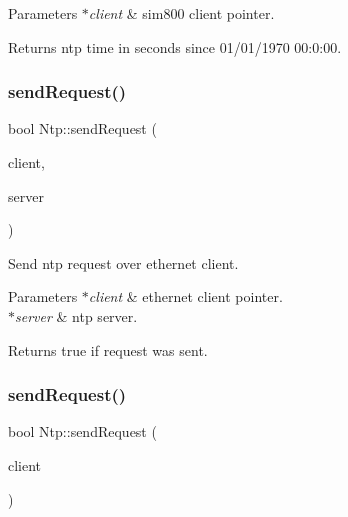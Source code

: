 \begin{DoxyParams}{Parameters}
{\em $\ast$client} & sim800 client pointer. \\
\hline
\end{DoxyParams}
\begin{DoxyReturn}{Returns}
ntp time in seconds since 01/01/1970 00\+:0\+:00. 
\end{DoxyReturn}
\mbox{\label{classNtp_a439e0498ea9209f74d91d7cf4d8805b0}} 
\subsubsection{\texorpdfstring{send\+Request()}{sendRequest()}\hspace{0.1cm}{\footnotesize\ttfamily [1/2]}}
{\footnotesize\ttfamily bool Ntp\+::send\+Request (\begin{DoxyParamCaption}\item[{Ethernet\+U\+DP $\ast$}]{client,  }\item[{const char $\ast$}]{server }\end{DoxyParamCaption})\hspace{0.3cm}{\ttfamily [static]}}



Send ntp request over ethernet client. 


\begin{DoxyParams}{Parameters}
{\em $\ast$client} & ethernet client pointer. \\
\hline
{\em $\ast$server} & ntp server. \\
\hline
\end{DoxyParams}
\begin{DoxyReturn}{Returns}
true if request was sent. 
\end{DoxyReturn}
\mbox{\label{classNtp_a98c5dfc44e09069f5ec607adba8177b2}} 
\subsubsection{\texorpdfstring{send\+Request()}{sendRequest()}\hspace{0.1cm}{\footnotesize\ttfamily [2/2]}}
{\footnotesize\ttfamily bool Ntp\+::send\+Request (\begin{DoxyParamCaption}\item[{sim800\+Client $\ast$}]{client }\end{DoxyParamCaption})\hspace{0.3cm}{\ttfamily [static]}}



